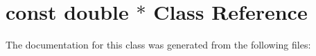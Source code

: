 \hypertarget{classconst_01double_01_5}{}\section{const double $\ast$ Class Reference}
\label{classconst_01double_01_5}


The documentation for this class was generated from the following files\+: